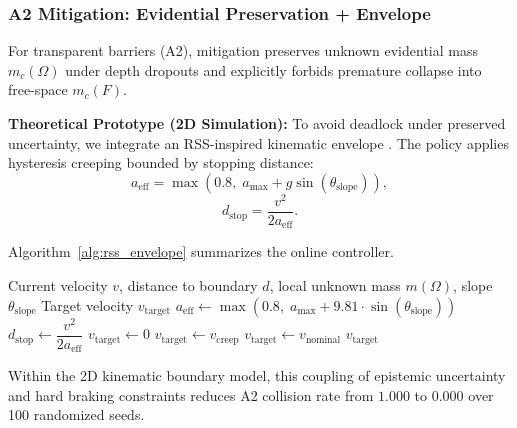 \documentclass[sigconf,nonacm]{acmart}
\begin{document}
\subsubsection{A2 Mitigation: Evidential Preservation + Envelope}

For transparent barriers (A2), mitigation preserves unknown evidential mass $m_c(\Omega)$ under depth dropouts and explicitly forbids premature collapse into free-space $m_c(F)$.

\textbf{Theoretical Prototype (2D Simulation):} To avoid deadlock under preserved uncertainty, we integrate an RSS-inspired kinematic envelope \cite{shalev2017}. The policy applies hysteresis creeping bounded by stopping distance:
\begin{equation}
a_{\text{eff}}=\max\!\left(0.8,\;a_{\text{max}}+g\sin\!\left(\theta_{\text{slope}}\right)\right),
\label{eq:a_eff}
\end{equation}
\begin{equation}
d_{\text{stop}}=\frac{v^2}{2a_{\text{eff}}}.
\label{eq:d_stop_mitigation}
\end{equation}

Algorithm~\ref{alg:rss_envelope} summarizes the online controller.
\begin{algorithm}[t]
\caption{Kinematic Safety Envelope under Evidential Uncertainty}
\label{alg:rss_envelope}
\begin{algorithmic}[1]
\Require Current velocity $v$, distance to boundary $d$, local unknown mass $m(\Omega)$, slope $\theta_{\text{slope}}$
\Ensure Target velocity $v_{\text{target}}$
\State $a_{\text{eff}} \gets \max(0.8,\; a_{\text{max}} + 9.81 \cdot \sin(\theta_{\text{slope}}))$
\State $d_{\text{stop}} \gets \dfrac{v^2}{2a_{\text{eff}}}$
    \State $v_{\text{target}} \gets 0$ 
  \Else
    \State $v_{\text{target}} \gets v_{\text{creep}}$ 
  \EndIf
\Else
  \State $v_{\text{target}} \gets v_{\text{nominal}}$
\EndIf
\State \Return $v_{\text{target}}$
\end{algorithmic}
\end{algorithm}

Within the 2D kinematic boundary model, this coupling of epistemic uncertainty and hard braking constraints reduces A2 collision rate from $1.000$ to $0.000$ over 100 randomized seeds.
\end{document}
